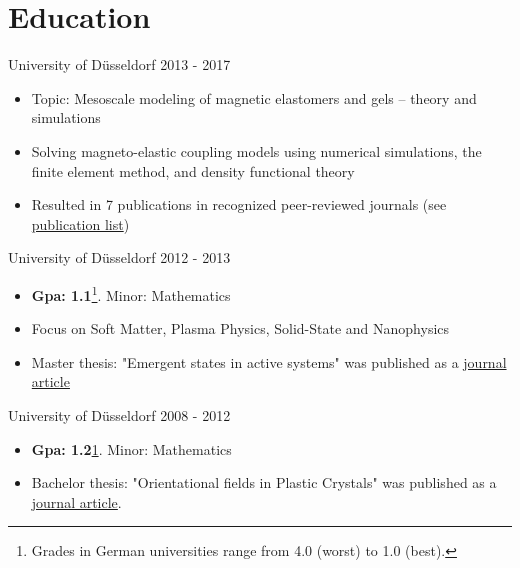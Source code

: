 \documentclass[singlesided,
               paper=a4,
               fontsize=10pt
              ]{my-resume}
\begin{document}
\section[\faMortarBoard]{Education}
    {University of Düsseldorf}
    {2013 - 2017}
    {
        \begin{itemize}[leftmargin=2em]
            \item Topic: Mesoscale modeling of magnetic elastomers and gels -- theory and simulations
            \item Solving magneto-elastic coupling models using numerical simulations, the finite element method, and density functional theory
            \item Resulted in 7 publications in recognized peer-reviewed journals (see \href{https://scholar.google.com/citations?hl=de&user=MnU8ZxwAAAAJ}{publication list})
        \end{itemize}
    }
%
    {University of Düsseldorf}
    {2012 - 2013}
    {
        \begin{itemize}[leftmargin=2em]
            \item \textbf{Gpa: 1.1}\footnote{\label{footnote1}Grades in German universities range from 4.0 (worst) to 1.0 (best).}. Minor: Mathematics
            \item Focus on Soft Matter, Plasma Physics, Solid-State and Nanophysics
            \item Master thesis: "Emergent states in active systems" was published as a \href{https://journals.aps.org/pre/abstract/10.1103/PhysRevE.89.022307}{journal article}
        \end{itemize}
    }
%
    {University of Düsseldorf}
    {2008 - 2012}
    {
        \begin{itemize}[leftmargin=2em]
            \item \textbf{Gpa: 1.2}\cref{footnote1}. Minor: Mathematics
            \item Bachelor thesis: "Orientational fields in Plastic Crystals" was published as a \href{https://epljournal.edpsciences.org/articles/epl/abs/2012/15/epl14756/epl14756.html}{journal article}.
        \end{itemize}
    }
\end{document}

